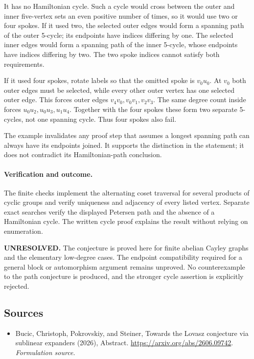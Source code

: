 \documentclass[11pt]{article}
\begin{document}
It has no Hamiltonian cycle. Such a cycle would cross between the outer and inner five-vertex sets an even positive number of times, so it would use two or four spokes. If it used two, the selected outer edges would form a spanning path of the outer 5-cycle; its endpoints have indices differing by one. The selected inner edges would form a spanning path of the inner 5-cycle, whose endpoints have indices differing by two. The two spoke indices cannot satisfy both requirements.

If it used four spokes, rotate labels so that the omitted spoke is $v_0u_0$. At $v_0$ both outer edges must be selected, while every other outer vertex has one selected outer edge. This forces outer edges
$v_4v_0,v_0v_1,v_2v_3$. The same degree count inside forces
$u_0u_2,u_0u_3,u_1u_4$. Together with the four spokes these form two separate 5-cycles, not one spanning cycle. Thus four spokes also fail.

The example invalidates any proof step that assumes a longest spanning path can always have its endpoints joined. It supports the distinction in the statement; it does not contradict its Hamiltonian-path conclusion.

\paragraph{Verification and outcome.}
The finite checks implement the alternating coset traversal for several products of cyclic groups and verify uniqueness and adjacency of every listed vertex. Separate exact searches verify the displayed Petersen path and the absence of a Hamiltonian cycle. The written cycle proof explains the result without relying on enumeration.

\textbf{UNRESOLVED.} The conjecture is proved here for finite abelian Cayley graphs and the elementary low-degree cases. The endpoint compatibility required for a general block or automorphism argument remains unproved. No counterexample to the path conjecture is produced, and the stronger cycle assertion is explicitly rejected.

\subsection{Sources}
\begin{itemize}
\item[S1]Bucic, Christoph, Pokrovskiy, and Steiner, Towards the Lovasz conjecture via sublinear expanders (2026), Abstract.
\url{https://arxiv.org/abs/2606.09742}.
\textit{Formulation source.}
\end{itemize}
\end{document}
